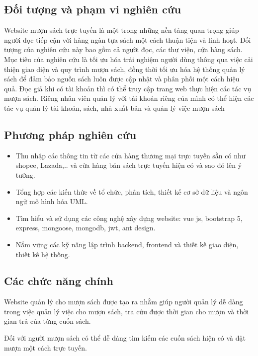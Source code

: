 \subsection{Đối tượng và phạm vi nghiên cứu}
Website mượn sách trực tuyến là một trong những nền tảng quan trọng giúp người đọc tiếp cận với hàng ngàn tựa sách một cách thuận tiện và linh hoạt. Đối tượng của nghiên cứu này bao gồm cả người đọc, các thư viện, cửa hàng sách. Mục tiêu của nghiên cứu là tối ưu hóa trải nghiệm người dùng thông qua việc cải thiện giao diện và quy trình mượn sách, đồng thời tối ưu hóa hệ thống quản lý sách để đảm bảo nguồn sách luôn được cập nhật và phân phối một cách hiệu quả. Đọc giả khi có tài khoản thì có thể truy cập trang web thực hiện các tác vụ mượn sách. Riêng nhân viên quản lý với tài khoản riêng của mình có thể hiện các tác vụ quản lý tài khoản, sách, nhà xuất bản và quản lý việc mượn sách\par

\subsection{Phương pháp nghiên cứu}
\begin{itemize}[label={-}]
    \item Thu nhập các thông tin từ các cửa hàng thương mại trực tuyến sẵn có như shopee, Lazada,.. và cửa hàng bán sách trực tuyến hiện có và sao đó lên ý tưởng.
    \item Tổng hợp các kiến thức về tổ chức, phân tích, thiết kế cơ sở dữ liệu và ngôn ngữ mô hình hóa UML.
    \item Tìm hiểu và sử dụng các công nghệ xây dựng website: vue js,  bootstrap 5, express, mongoose, mongodb,  jwt, ant design.
    \item Nắm vững các kỹ năng lập trình backend, frontend và thiết kế giao diện, thiết kế hệ thống.
\end{itemize}

\subsection{Các chức năng chính}
Website quản lý cho mượn sách được tạo ra nhằm giúp người quản lý dễ dàng trong việc quản lý việc cho mượn sách, tra cứu được thời gian cho mượn và thời gian trả của từng cuốn sách. \par
Đối với người mượn sách có thể dễ dàng tìm kiếm các cuốn sách hiện có và đặt mượn một cách trực tuyến.

